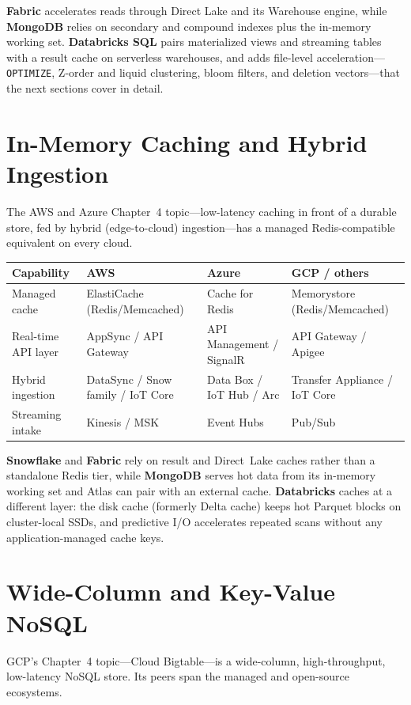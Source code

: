 \noindent \textbf{Fabric} accelerates reads through Direct Lake and its Warehouse engine, while
\textbf{MongoDB} relies on secondary and compound indexes plus the in-memory working set.
\textbf{Databricks SQL} pairs materialized views and streaming tables with a result cache on
serverless warehouses, and adds file-level acceleration---\texttt{OPTIMIZE}, Z-order and liquid
clustering, bloom filters, and deletion vectors---that the next sections cover in detail.

\section{In-Memory Caching and Hybrid Ingestion}
%
The AWS and Azure Chapter~4 topic---low-latency caching in front of a durable store, fed by hybrid
(edge-to-cloud) ingestion---has a managed Redis-compatible equivalent on every cloud.

\begin{center}
\footnotesize
\begin{tabular}{@{}p{2.8cm}p{3.0cm}p{3.0cm}p{3.4cm}@{}}
\toprule
\textbf{Capability} & \textbf{AWS} & \textbf{Azure} & \textbf{GCP / others} \\
\midrule
Managed cache & ElastiCache (Redis/Memcached) & Cache for Redis & Memorystore (Redis/Memcached) \\
Real-time API layer & AppSync / API Gateway & API Management / SignalR & API Gateway / Apigee \\
Hybrid ingestion & DataSync / Snow family / IoT Core & Data Box / IoT Hub / Arc & Transfer Appliance / IoT Core \\
Streaming intake & Kinesis / MSK & Event Hubs & Pub/Sub \\
\bottomrule
\end{tabular}
\end{center}

\noindent \textbf{Snowflake} and \textbf{Fabric} rely on result and Direct~Lake caches rather than a
standalone Redis tier, while \textbf{MongoDB} serves hot data from its in-memory working set and
Atlas can pair with an external cache. \textbf{Databricks} caches at a different layer: the
disk cache (formerly Delta cache) keeps hot Parquet blocks on cluster-local SSDs, and
predictive I/O accelerates repeated scans without any application-managed cache keys.

\section{Wide-Column and Key-Value NoSQL}
%
GCP's Chapter~4 topic---Cloud Bigtable---is a wide-column, high-throughput, low-latency NoSQL store.
Its peers span the managed and open-source ecosystems.

